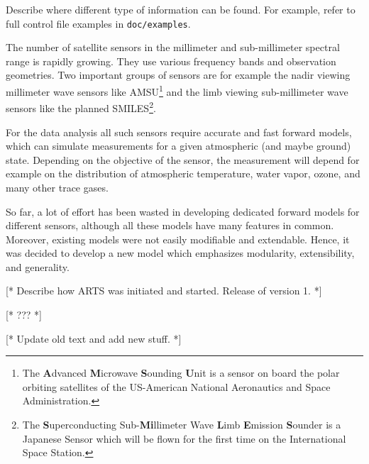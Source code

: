 \label{sec:intro:guide}

Describe where different type of information can be found. For
example, refer to full control file examples in \verb|doc/examples|.





\label{sec:intro:background}

The number of satellite sensors in the millimeter and sub-millimeter
spectral range is rapidly growing. They use various frequency
bands and observation geometries. Two important groups of
sensors are for example the nadir viewing millimeter wave
sensors like AMSU\footnote{The \textbf{A}dvanced
  \textbf{M}icrowave \textbf{S}ounding \textbf{U}nit is a
  sensor on board the polar orbiting satellites of the
  US-American National Aeronautics and Space Administration.}
and the limb viewing sub-millimeter wave sensors like the
planned SMILES\footnote{The \textbf{S}uperconducting
  Sub-\textbf{Mi}llimeter Wave \textbf{L}imb \textbf{E}mission
  \textbf{S}ounder is a Japanese Sensor which will be flown
  for the first time on the International Space Station.}.

For the data analysis all such sensors require accurate and
fast forward models, which can simulate measurements for a
given atmospheric (and maybe ground) state. Depending on the
objective of the sensor, the measurement will depend for
example on the distribution of atmospheric temperature, water
vapor, ozone, and many other trace gases.

So far, a lot of effort has been wasted in developing dedicated
forward models for different sensors, although all these models have
many features in common. Moreover, existing models were not easily
modifiable and extendable. Hence, it was decided to develop a new
model which emphasizes modularity, extensibility, and generality.

[* Describe how ARTS was initiated and started. Release of version 1. *]


\label{sec:intro:whatis}

[* ??? *]


\label{sec:intro:scope}

[* Update old text and add new stuff. *]

